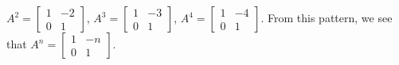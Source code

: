 $A^2 = \begin{bmatrix}1 & -2\\ 0 & 1\end{bmatrix}$, 
$A^3 = \begin{bmatrix}1 & -3\\ 0 & 1\end{bmatrix}$, 
$A^4 = \begin{bmatrix}1 & -4\\ 0 & 1\end{bmatrix}$.  
From this pattern, we see that 
$A^n = \begin{bmatrix}1 & -n\\ 0 & 1\end{bmatrix}$.
